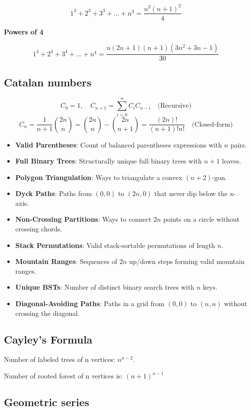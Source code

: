 \documentclass[10pt]{article}
\begin{document}
\begin{multicols*}{2}
\[
1^3+2^3+3^3+...+n^3 = \frac{n^2(n+1)^2}{4}
\]

\textbf{Powers of 4}

\[
1^4+2^4+3^4+...+n^4 = \frac{n(2n+1)(n+1)(3n^2+3n-1)}{30}
\]

\subsection{Catalan numbers}
\[
C_0 = 1, \quad C_{n+1} = \sum_{i=0}^{n} C_i C_{n-i} \quad \text{(Recursive)}
\]
\[
C_n = \frac{1}{n+1} \binom{2n}{n} = \binom{2n}{n} - \binom{2n}{n+1} = \frac{(2n)!}{(n+1)!n!} \quad \text{(Closed-form)}
\]

\begin{itemize}
    \item \textbf{Valid Parentheses}: Count of balanced parentheses expressions with \( n \) pairs.
    \item \textbf{Full Binary Trees}: Structurally unique full binary trees with \( n+1 \) leaves.
    \item \textbf{Polygon Triangulation}: Ways to triangulate a convex \( (n+2) \)-gon.
    \item \textbf{Dyck Paths}: Paths from \( (0,0) \) to \( (2n,0) \) that never dip below the x-axis.
    \item \textbf{Non-Crossing Partitions}: Ways to connect \( 2n \) points on a circle without crossing chords.
    \item \textbf{Stack Permutations}: Valid stack-sortable permutations of length \( n \).
    \item \textbf{Mountain Ranges}: Sequences of \( 2n \) up/down steps forming valid mountain ranges.
    \item \textbf{Unique BSTs}: Number of distinct binary search trees with \( n \) keys.
    \item \textbf{Diagonal-Avoiding Paths}: Paths in a grid from \( (0,0) \) to \( (n,n) \) without crossing the diagonal.
\end{itemize}

\subsection{Cayley's Formula}

Number of labeled trees of n vertices: $n^{n-2}$.

Number of rooted forest of n vertices is: $(n+1)^{n-1}$

\subsection{Geometric series}


\end{multicols*}
\end{document}
